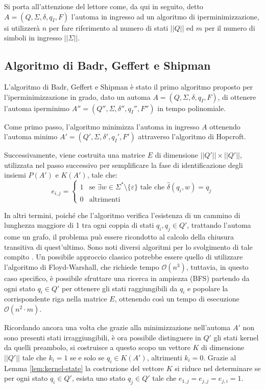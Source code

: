 \documentclass[a4paper,12pt]{report} %
\newcommand{\bigo}[0]{\mathcal{O}}            %
\begin{document}
Si porta all'attenzione del lettore come, da qui in seguito, detto $A = (Q, \Sigma, \delta, q_I, F)$
l'automa in ingresso ad un algoritmo di iperminimizzazione, si utilizzerà $n$ per fare riferimento
al numero di stati $||Q||$ ed $m$ per il numero di simboli in ingresso $||\Sigma||$.

\subsection{Algoritmo di Badr, Geffert e Shipman}

L'algoritmo di Badr, Geffert e Shipman \parencite{BGS09} è stato il primo algoritmo proposto per l'iperminimizzazione
in grado, dato un automa $A = (Q, \Sigma, \delta, q_I, F)$, di ottenere l'automa iperminimo 
$A'' = (Q'', \Sigma, \delta'', q_I'', F'')$ in tempo polinomiale.

Come primo passo, l'algoritmo minimizza l'automa in ingresso $A$ ottenendo l'automa minimo 
$A' = (Q', \Sigma, \delta', q_I', F')$ attraverso l'algoritmo di Hopcroft.

Successivamente, viene costruita una matrice $E$ di dimensione $||Q'|| \times ||Q'||$, utilizzata nel
passo successivo per semplificare la fase di identificazione degli insiemi $P(A')$ e $K(A')$, tale che:
\begin{equation*}
  e_{i,j} =
  \begin{cases}
    1 & \text{se } \exists w \in \Sigma^* \setminus \{ \varepsilon \} \text{ tale che } \hat{\delta}(q_i, w) = q_j \\
    0 & \text{altrimenti}
  \end{cases}
\end{equation*}

In altri termini, poiché che l'algoritmo verifica l'esistenza di un cammino di lunghezza maggiore di
1 tra ogni coppia di stati $q_i, q_j \in Q'$, trattando l'automa come un grafo, il problema può essere ricondotto 
al calcolo della chiusura transitiva di quest'ultimo. 
Sono noti diversi algoritmi per lo svolgimento di tale compito \parencite{DFI08}. Un possibile approccio classico potrebbe
essere quello di utilizzare l'algoritmo di Floyd-Warshall, che richiede tempo $\bigo(n^3)$, tuttavia, in questo 
caso specifico, è possibile sfruttare una ricerca in ampiezza (BFS) partendo da ogni stato $q_i \in Q'$ per
ottenere gli stati raggiungibili da $q_i$ e popolare la corrispondente riga nella matrice $E$, ottenendo
così un tempo di esecuzione $\bigo(n^2 \cdot m)$.

Ricordando ancora una volta che grazie alla minimizzazione nell'automa $A'$ non sono presenti stati irraggiungibili,
è ora possibile distinguere in $Q'$ gli stati kernel da quelli preambolo, si costruisce a questo scopo
un vettore $K$ di dimensione $||Q'||$ tale che $k_i = 1$ se e solo se $q_i \in K(A')$, altrimenti $k_i = 0$.
Grazie al Lemma \ref{lem:kernel-state} la costruzione del vettore $K$ si riduce nel determinare se per ogni
stato $q_i \in Q'$, esista uno stato $q_j \in Q'$ tale che $e_{1,j} = e_{j,j} = e_{j,i} = 1$.
\end{document}
